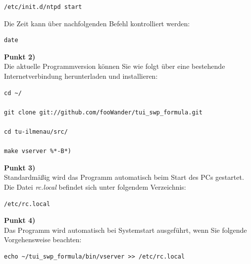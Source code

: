 \documentclass[fontsize = 12pt, paper = a4]{scrreprt}
\begin{document}
\vspace*{4mm}
\begin{lstlisting}[frame=single]
/etc/init.d/ntpd start
\end{lstlisting} 
\vspace*{-2mm}

Die Zeit kann über nachfolgenden Befehl kontrolliert werden:

\vspace*{4mm}
\begin{lstlisting}[frame=single]
date
\end{lstlisting} 
\vspace*{-2mm}

\textbf{Punkt 2)} \\

Die aktuelle Programmversion können Sie wie folgt über eine bestehende Internetverbindung herunterladen und installieren:

\vspace*{4mm}
\begin{lstlisting}[frame=single]
cd ~/
 
git clone git://github.com/fooWander/tui_swp_formula.git

cd tu-ilmenau/src/

make vserver %*-B*)
\end{lstlisting} 
\vspace*{-2mm}

\textbf{Punkt 3)} \\

Standardmäßig wird das Programm automatisch beim Start des PCs gestartet. Die Datei \textit{rc.local} befindet sich unter folgendem Verzeichnis:

\vspace*{4mm}
\begin{lstlisting}[frame=single]
/etc/rc.local
\end{lstlisting} 
\vspace*{-2mm}

\textbf{Punkt 4)} \\

Das Programm wird automatisch bei Systemstart ausgeführt, wenn Sie folgende Vorgehensweise beachten:

\vspace*{4mm}
\begin{lstlisting}[frame=single]
echo ~/tui_swp_formula/bin/vserver >> /etc/rc.local
\end{lstlisting} 
\vspace*{-2mm}
%
\end{document}
